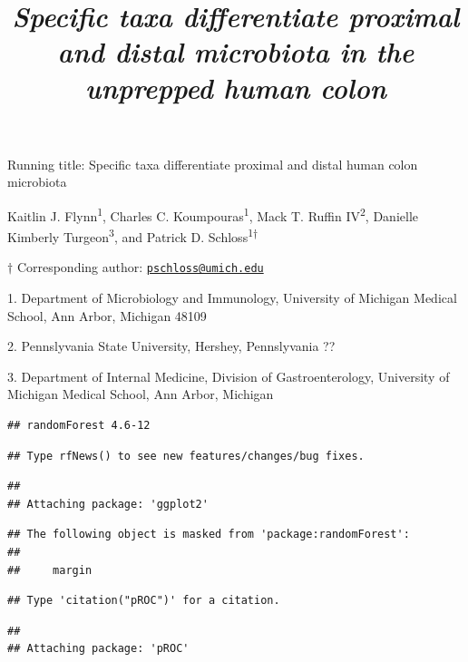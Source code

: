 \documentclass[11pt,]{article}
\title{\emph{Specific taxa differentiate proximal and distal microbiota in the
unprepped human colon}}
\author{}
\date{}
\begin{document}
\maketitle

\vspace{35mm}

Running title: Specific taxa differentiate proximal and distal human
colon microbiota

\vspace{35mm}

Kaitlin J. Flynn\textsuperscript{1}, Charles C.
Koumpouras\textsuperscript{1}, Mack T. Ruffin IV\textsuperscript{2},
Danielle Kimberly Turgeon\textsuperscript{3}, and Patrick D.
Schloss\textsuperscript{1\(\dagger\)}

\vspace{35mm}

\(\dagger\) Corresponding author:
\href{mailto:pschloss@umich.edu}{\nolinkurl{pschloss@umich.edu}}

1. Department of Microbiology and Immunology, University of Michigan
Medical School, Ann Arbor, Michigan 48109

2. Pennslyvania State University, Hershey, Pennslyvania ??

3. Department of Internal Medicine, Division of Gastroenterology,
University of Michigan Medical School, Ann Arbor, Michigan

\newpage

\linenumbers

\begin{verbatim}
## randomForest 4.6-12
\end{verbatim}

\begin{verbatim}
## Type rfNews() to see new features/changes/bug fixes.
\end{verbatim}

\begin{verbatim}
## 
## Attaching package: 'ggplot2'
\end{verbatim}

\begin{verbatim}
## The following object is masked from 'package:randomForest':
## 
##     margin
\end{verbatim}

\begin{verbatim}
## Type 'citation("pROC")' for a citation.
\end{verbatim}

\begin{verbatim}
## 
## Attaching package: 'pROC'
\end{verbatim}
\end{document}
